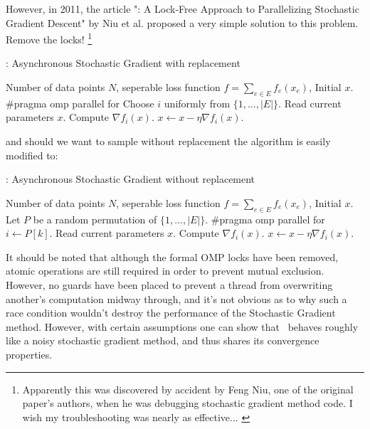 However, in 2011, the article "\hogwild: A Lock-Free Approach to Parallelizing
Stochastic Gradient Descent" by Niu et al. \cite{2011NRRW} proposed a very
simple solution to this problem. Remove the locks!%
\footnote{
  Apparently this was discovered by accident by Feng Niu, one of the original
  paper's authors, when he was debugging stochastic gradient method code. I wish
  my troubleshooting was nearly as effective... \cite{2014Recht}
} \clearpage
\begin{breakablealgorithm}
  \caption{\hogwild: Asynchronous Stochastic Gradient with replacement}
  \label{alg:hogwildwreplacement}
  \begin{algorithmic}[1]
    \Require Number of data points $N$, seperable loss function $f
    = \sum_{e \in E} f_e(x_e)$, Initial $x$.
      \State \#pragma omp parallel for
        \State Choose $i$ uniformly from $\{1, \dots, |E|\}$.
        \State Read current parameters $x$.
        \State Compute $\nabla f_i(x)$.
        \State $x \gets x - \eta \nabla f_i(x)$. 
      \EndFor
    \EndFor
  \end{algorithmic}
\end{breakablealgorithm}
and should we want to sample without replacement the algorithm is easily
modified to:
\begin{breakablealgorithm}
  \caption{\hogwild: Asynchronous Stochastic Gradient without replacement}
  \label{alg:hogwildworeplacement}
  \begin{algorithmic}[1]
    \Require Number of data points $N$, seperable loss function $f
    = \sum_{e \in E} f_e(x_e)$, Initial $x$.
      \State Let $P$ be a random permutation of $\{1, \dots, |E|\}$.
      \State \#pragma omp parallel for
        \State $i \gets P[k]$.
        \State Read current parameters $x$.
        \State Compute $\nabla f_i(x)$.
        \State $x \gets x - \eta \nabla f_i(x)$. 
      \EndFor
    \EndFor
  \end{algorithmic}
\end{breakablealgorithm}

It should be noted that although the formal OMP locks have been removed, atomic
operations are still required in order to prevent mutual exclusion. However, no
guards have been placed to prevent a thread from overwriting another's
computation midway through, and it's not obvious as to why such a race condition
wouldn't destroy the performance of the Stochastic Gradient method. However,
with certain assumptions one can show that \hogwild\ behaves roughly like a noisy
stochastic gradient method, and thus shares its convergence properties.
